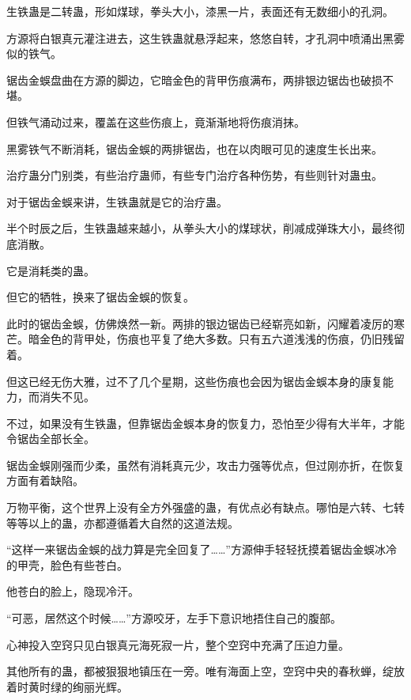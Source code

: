 
\begin{this_body}



生铁蛊是二转蛊，形如煤球，拳头大小，漆黑一片，表面还有无数细小的孔洞。

方源将白银真元灌注进去，这生铁蛊就悬浮起来，悠悠自转，才孔洞中喷涌出黑雾似的铁气。

锯齿金蜈盘曲在方源的脚边，它暗金色的背甲伤痕满布，两排银边锯齿也破损不堪。

但铁气涌动过来，覆盖在这些伤痕上，竟渐渐地将伤痕消抹。

黑雾铁气不断消耗，锯齿金蜈的两排锯齿，也在以肉眼可见的速度生长出来。

治疗蛊分门别类，有些治疗蛊师，有些专门治疗各种伤势，有些则针对蛊虫。

对于锯齿金蜈来讲，生铁蛊就是它的治疗蛊。

半个时辰之后，生铁蛊越来越小，从拳头大小的煤球状，削减成弹珠大小，最终彻底消散。

它是消耗类的蛊。

但它的牺牲，换来了锯齿金蜈的恢复。

此时的锯齿金蜈，仿佛焕然一新。两排的银边锯齿已经崭亮如新，闪耀着凌厉的寒芒。暗金色的背甲处，伤痕也平复了绝大多数。只有五六道浅浅的伤痕，仍旧残留着。

但这已经无伤大雅，过不了几个星期，这些伤痕也会因为锯齿金蜈本身的康复能力，而消失不见。

不过，如果没有生铁蛊，但靠锯齿金蜈本身的恢复力，恐怕至少得有大半年，才能令锯齿全部长全。

锯齿金蜈刚强而少柔，虽然有消耗真元少，攻击力强等优点，但过刚亦折，在恢复方面有着缺陷。

万物平衡，这个世界上没有全方外强盛的蛊，有优点必有缺点。哪怕是六转、七转等等以上的蛊，亦都遵循着大自然的这道法规。

“这样一来锯齿金蜈的战力算是完全回复了……”方源伸手轻轻抚摸着锯齿金蜈冰冷的甲壳，脸色有些苍白。

他苍白的脸上，隐现冷汗。

“可恶，居然这个时候……”方源咬牙，左手下意识地捂住自己的腹部。

心神投入空窍只见白银真元海死寂一片，整个空窍中充满了压迫力量。

其他所有的蛊，都被狠狠地镇压在一旁。唯有海面上空，空窍中央的春秋蝉，绽放着时黄时绿的绚丽光辉。


\end{this_body}
